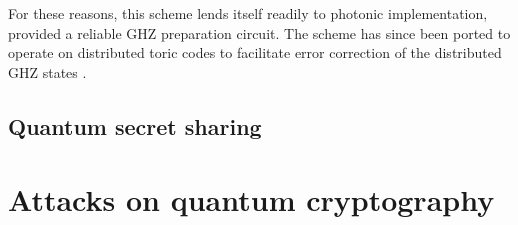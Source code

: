 For these reasons, this scheme lends itself readily to photonic implementation, provided a reliable GHZ preparation circuit. The scheme has since been ported to operate on distributed toric codes to facilitate error correction of the distributed GHZ states \cite{bib:MenicucciExpQAB}.

%
%

\subsection{Quantum secret sharing}


%
%

\section{Attacks on quantum cryptography}



